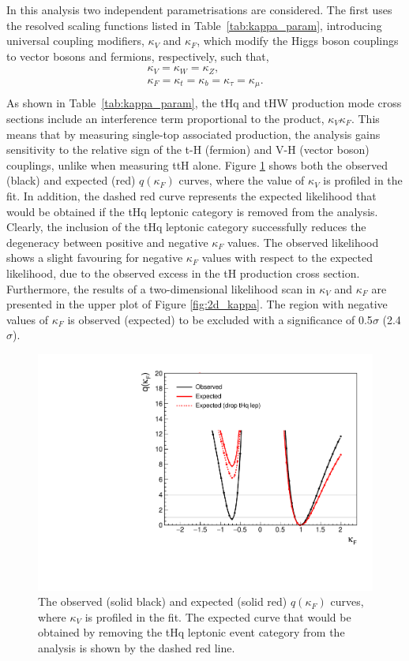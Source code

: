 In this analysis two independent parametrisations are considered. The first uses the resolved scaling functions listed in Table~\ref{tab:kappa_param}, introducing universal coupling modifiers, $\kappa_V$ and $\kappa_F$, which modify the Higgs boson couplings to vector bosons and fermions, respectively, such that,
\begin{equation}
    \begin{split}
        \kappa_V = \kappa_W = \kappa_Z, \\
        \kappa_F = \kappa_t = \kappa_b = \kappa_\tau = \kappa_\mu. \\
    \end{split}
\end{equation}
\noindent
As shown in Table~\ref{tab:kappa_param}, the tHq and tHW production mode cross sections include an interference term proportional to the product, $\kappa_V\kappa_F$. This means that by measuring single-top associated production, the analysis gains sensitivity to the relative sign of the t-H (fermion) and V-H (vector boson) couplings, unlike when measuring ttH alone. Figure \ref{fig:kappa_F} shows both the observed (black) and expected (red) $q(\kappa_F)$ curves, where the value of $\kappa_V$ is profiled in the fit. In addition, the dashed red curve represents the expected likelihood that would be obtained if the tHq leptonic category is removed from the analysis. Clearly, the inclusion of the tHq leptonic category successfully reduces the degeneracy between positive and negative $\kappa_F$ values. The observed likelihood shows a slight favouring for negative $\kappa_F$ values with respect to the expected likelihood, due to the observed excess in the tH production cross section. Furthermore, the results of a two-dimensional likelihood scan in $\kappa_V$ and $\kappa_F$ are presented in the upper plot of Figure \ref{fig:2d_kappa}. The region with negative values of $\kappa_F$ is observed (expected) to be excluded with a significance of 0.5$\sigma$ (2.4$\sigma$).

\begin{figure}[htb]
  \centering
  \includegraphics[width=.6\textwidth]{Figures/hgg_results/profile1D_kappa_F.pdf}
  \caption[Observed and expected likelihood curves for $\kappa_F$]
  {
    The observed (solid black) and expected (solid red) $q(\kappa_F)$ curves, where $\kappa_V$ is profiled in the fit. The expected curve that would be obtained by removing the tHq leptonic event category from the analysis is shown by the dashed red line.
  }
  \label{fig:kappa_F}
\end{figure}

